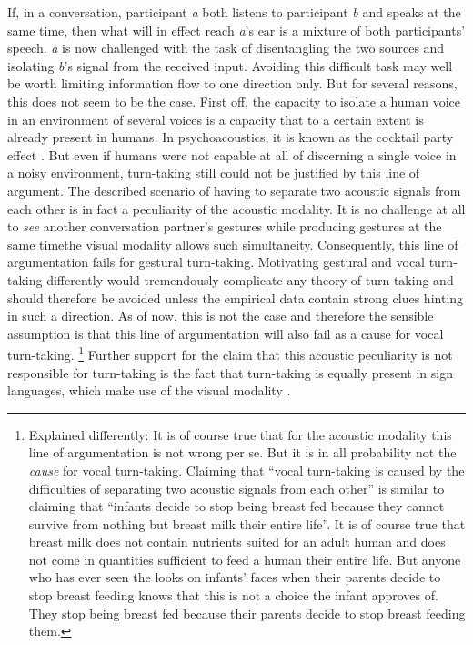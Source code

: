If, in a conversation, participant \emph{a} both listens to participant \emph{b} and speaks at the same time, then what will in effect reach \emph{a}'s ear is a mixture of both participants' speech.
\emph{a} is now challenged with the task of disentangling the two sources and isolating \emph{b}'s signal from the received input.
Avoiding this difficult task may well be worth limiting information flow to one direction only.
But for several reasons, this does not seem to be the case.
First off, the capacity to isolate a human voice in an environment of several voices is a capacity that to a certain extent is already present in humans.
In psychoacoustics, it is known as the cocktail party effect \citep[first mentioned in][a more recent review is given in \citeauthor{arons_review_1992}, \citeyear{arons_review_1992}]{pollack_cocktail_1957}.
But even if humans were not capable at all of discerning a single voice in a noisy environment, turn-taking still could not be justified by this line of argument. The described scenario of having to separate two acoustic signals from each other is in fact a peculiarity of the acoustic modality.
It is no challenge at all to \emph{see} another conversation partner's gestures while producing gestures at the same time\dash the visual modality allows such simultaneity.
Consequently, this line of argumentation fails for gestural turn-taking.
Motivating gestural and vocal turn-taking differently would tremendously complicate any theory of turn-taking and should therefore be avoided unless the empirical data contain strong clues hinting in such a direction.
As of now, this is not the case and therefore the sensible assumption is that this line of argumentation will also fail as a cause for vocal turn-taking.%
\footnote{
Explained differently:
It is of course true that for the acoustic modality this line of argumentation is not wrong per se.
But it is in all probability not the \emph{cause} for vocal turn-taking. %
Claiming that ``vocal turn-taking is caused by the difficulties of separating two acoustic signals from each other'' is similar to claiming that ``infants decide to stop being breast fed because they cannot survive from nothing but breast milk their entire life''.
It is of course true that breast milk does not contain nutrients suited for an adult human and does not come in quantities sufficient to feed a human their entire life.
But anyone who has ever seen the looks on infants' faces when their parents decide to stop breast feeding knows that this is not a choice the infant approves of.
They stop being breast fed because their parents decide to stop breast feeding them.}
Further support for the claim that this acoustic peculiarity is not responsible for turn-taking is the fact that turn-taking is equally present in sign languages, which make use of the visual modality \citep[see e.g.][among many others]{devos_turn-timing_2015,girard-groeber_management_2015, groeber_turns_2014,manrique_suspending_2015,mcclearly_turn-taking_2013}.


